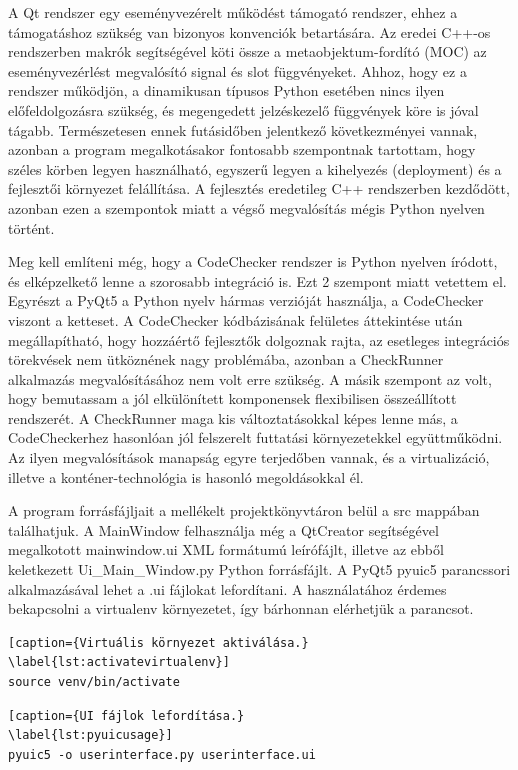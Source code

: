\documentclass[a4paper,12pt]{report}
\begin{document}
A Qt rendszer egy eseményvezérelt működést támogató rendszer, ehhez a támogatáshoz szükség van bizonyos konvenciók betartására. Az eredei C++-os rendszerben makrók segítségével köti össze a metaobjektum-fordító (MOC) az eseményvezérlést megvalósító signal és slot függvényeket. Ahhoz, hogy ez a rendszer működjön, a dinamikusan típusos Python esetében nincs ilyen előfeldolgozásra szükség, és megengedett jelzéskezelő függvények köre is jóval tágabb. Természetesen ennek futásidőben jelentkező következményei vannak, azonban a  program megalkotásakor fontosabb szempontnak tartottam, hogy széles körben legyen használható, egyszerű legyen a kihelyezés (deployment) és a fejlesztői környezet felállítása. A fejlesztés eredetileg C++ rendszerben kezdődött, azonban ezen a szempontok miatt a végső megvalósítás mégis Python nyelven történt.

Meg kell említeni még, hogy a CodeChecker rendszer is Python nyelven íródott, és elképzelkető lenne a szorosabb integráció is. Ezt 2 szempont miatt vetettem el. Egyrészt a PyQt5 a Python nyelv hármas verzióját használja, a CodeChecker viszont a ketteset. A CodeChecker kódbázisának felületes áttekintése után megállapítható, hogy hozzáértő fejlesztők dolgoznak rajta, az esetleges integrációs törekvések nem ütköznének nagy problémába, azonban a CheckRunner alkalmazás megvalósításához nem volt erre szükség. A másik szempont az volt, hogy bemutassam a jól elkülönített komponensek flexibilisen összeállított rendszerét. A CheckRunner maga kis változtatásokkal képes lenne más, a CodeCheckerhez hasonlóan jól felszerelt futtatási környezetekkel együttműködni. Az ilyen megvalósítások manapság egyre terjedőben vannak, és a virtualizáció, illetve a konténer-technológia is hasonló megoldásokkal él.

A program forrásfájljait a mellékelt projektkönyvtáron belül a src mappában találhatjuk. A MainWindow felhasználja még a QtCreator segítségével megalkotott mainwindow.ui XML formátumú leírófájlt, illetve az ebből keletkezett Ui\_Main\_Window.py Python forrásfájlt. A PyQt5 pyuic5 parancssori alkalmazásával lehet a .ui fájlokat lefordítani. A használatához érdemes bekapcsolni a virtualenv környezetet, így bárhonnan elérhetjük a parancsot.

\begin{lstlisting}[caption={Virtuális környezet aktiválása.}
\label{lst:activatevirtualenv}]
source venv/bin/activate
\end{lstlisting}

\begin{lstlisting}[caption={UI fájlok lefordítása.}
\label{lst:pyuicusage}]
pyuic5 -o userinterface.py userinterface.ui
\end{lstlisting}
\end{document}
